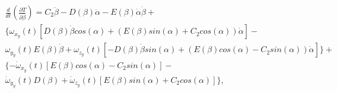 \begin{equation}%
\label{eq:p3:44+}
\begin{multlined}
\frac{d}{d t}\left( \frac{\partial T}{\partial \dot \beta}\right) = 
C_2 \ddot{\beta} - 
D(\beta) \ddot{\alpha} - 
E(\beta)\dot{\alpha}\dot{\beta}+
\\
\{  
	\omega_{x_y} (t) \left[  D(\beta) \dot{\beta} cos(\alpha) + ( E(\beta)sin(\alpha) + C_2 cos(\alpha) )\dot{\alpha}\right] -\\
	\omega_{y_y} (t) E(\beta)\dot{\beta}+
	\omega_{z_y} (t) \left[ 
		-D(\beta)\dot{\beta}sin(\alpha)
		+(
			E(\beta)cos(\alpha)
			-C_2 sin(\alpha)
		)\dot{\alpha}
	\right]
\}
+\\
\{
-\dot{\omega}_{x_y} (t) \left[ E(\beta)cos(\alpha) - C_2 sin(\alpha) \right] 
-\\\dot{\omega}_{y_y} (t) D(\beta)
+\dot{\omega}_{z_y} (t) \left[ E(\beta)sin(\alpha) + C_2 cos(\alpha)\right] 
\}
,
\end{multlined}
\end{equation}


